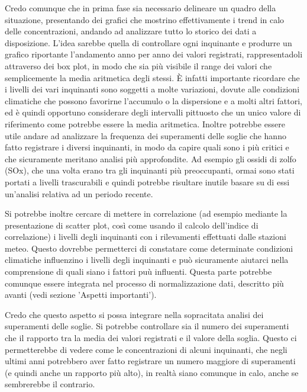 \documentclass{article}
\begin{document}
Credo comunque che in prima fase sia necessario delineare un quadro della situazione, presentando dei grafici che mostrino effettivamente i trend in calo delle concentrazioni, andando ad analizzare tutto lo storico dei dati a disposizione. L'idea sarebbe quella di controllare ogni inquinante e produrre un grafico riportante l'andamento anno per anno dei valori registrati, rappresentadoli attraverso dei box plot, in modo che sia più visibile il range dei valori che semplicemente la media aritmetica degli stessi. È infatti importante ricordare che i livelli dei vari inquinanti sono soggetti a molte variazioni, dovute alle condizioni climatiche che possono favorirne l'accumulo o la dispersione e a molti altri fattori, ed è quindi opportuno considerare degli intervalli pittuosto che un unico valore di riferimento come potrebbe essere la media aritmetica.
Inoltre potrebbe essere utile andare ad analizzare la frequenza dei superamenti delle soglie che hanno fatto registrare i diversi inquinanti, in modo da capire quali sono i più critici e che sicuramente meritano analisi più approfondite. Ad esempio gli ossidi di zolfo (SOx), che una volta erano tra gli inquinanti più preoccupanti, ormai sono stati portati a livelli trascurabili e quindi potrebbe risultare inutile basare su di essi un'analisi relativa ad un periodo recente.

Si potrebbe inoltre cercare di mettere in correlazione (ad esempio mediante la presentazione di scatter plot, così come usando il calcolo dell'indice di correlazione) i livelli degli inquinanti con i rilevamenti effettuati dalle stazioni meteo. Questo dovrebbe permetterci di constatare come determinate condizioni climatiche influenzino i livelli degli inquinanti e può sicuramente aiutarci nella comprensione di quali siano i fattori puù influenti. Questa parte potrebbe comunque essere integrata nel processo di normalizzazione dati, descritto più avanti (vedi sezione 'Aspetti importanti').

Credo che questo aspetto si possa integrare nella sopracitata analisi dei superamenti delle soglie. Si potrebbe controllare sia il numero dei superamenti che il rapporto tra la media dei valori registrati e il valore della soglia. Questo ci permetterebbe di vedere come le concentrazioni di alcuni inquinanti, che negli ultimi anni potrebbero aver fatto registrare un numero maggiore di superamenti (e quindi anche un rapporto più alto), in realtà siano comunque in calo, anche se sembrerebbe il contrario.
\end{document}
